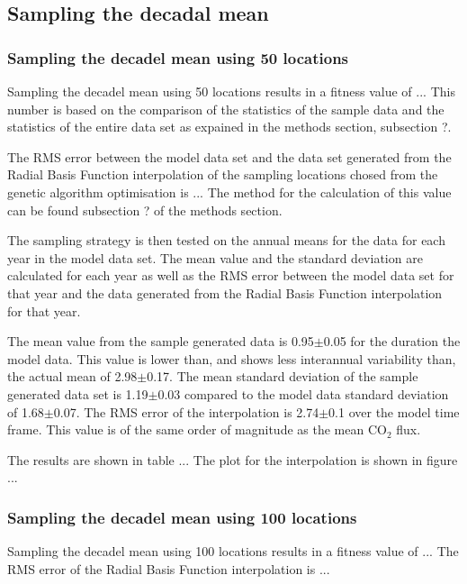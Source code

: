 \documentclass[11pt, a4paper]{article}
\numberwithin{figure}{section}
\numberwithin{table}{section}
\begin{document}
\subsection{Sampling the decadal mean}

\subsubsection{Sampling the decadel mean using 50 locations}
Sampling the decadel mean using 50 locations results in a fitness
value of ... 
This number is based on the comparison of the statistics
of the sample data and the statistics of the entire data set as
expained in the methods section, subsection ?.


The RMS error between the model data set and the data set generated 
from the Radial Basis Function interpolation of the sampling locations 
chosed from the genetic algorithm optimisation is ... 
The method for the calculation of this value can be found subsection ?
of the methods section.

The sampling strategy is then tested on the annual means for the data
for each year in the model data set. 
The mean value and the standard deviation are calculated for each year 
as well as the RMS error between the model data set for that year and
the data generated from the Radial Basis Function interpolation for 
that year.

The mean value from the sample generated data is 0.95$\pm$0.05 for 
the duration the model data. 
This value is lower than, and shows less interannual variability than,
the actual mean of 2.98$\pm$0.17.
The mean standard deviation of the sample generated data set is 
1.19$\pm$0.03 compared to the model data standard deviation of
1.68$\pm$0.07.
The RMS error of the interpolation is 2.74$\pm$0.1 over the model 
time frame. 
This value is of the same order of magnitude as the mean CO$_2$ flux.

The results are shown in table ...
The plot for the interpolation is shown in figure ...



\subsubsection{Sampling the decadel mean using 100 locations}
Sampling the decadel mean using 100 locations results in a fitness
value of ...
The RMS error of the Radial Basis Function interpolation is ...
\end{document}
